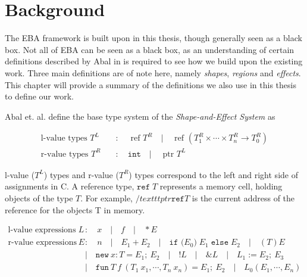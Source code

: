 \section{Background}
The EBA framework is built upon in this thesis, though generally seen as a black box. Not all of EBA can be seen as a black box, as an understanding of certain definitions described by Abal in \cite{Abal2017EffectiveBF} is required to see how we build upon the existing work. Three main definitions are of note here, namely \textit{shapes}, \textit{regions} and \textit{effects}. This chapter will provide a summary of the definitions we also use in this thesis to define our work. 

\newpar Abal et. al. define the base type system of the \textit{Shape-and-Effect System} as 

\begin{equation*}
\begin{aligned}
    \text {l-value types } T^{L} \quad &: \quad \text{ ref } T^{R} \quad | \quad \text{ ref } \left(T_{1}^{R} \times \cdots \times T_{n}^{R} \rightarrow T_{0}^{R}\right)\\
    \text {r-value types } T^{R} \quad &: \quad \texttt {int} \quad | \quad \text{ ptr } T^{L}
\end{aligned}
\end{equation*}

\noindent l-value ($T^{L}$) types and r-value ($T^{R}$) types correspond to the left and right side of assignments in C. A reference type, $\texttt{ref} \; T$ represents a memory cell, holding objects of the type $T$. For example, $/texttt{ptr} \texttt{ref} T$ is the current address of the reference for the objects T in memory. 

\begin{equation*}
\begin{aligned}
    \text {l-value expressions } L \quad &: \quad x \quad | \quad f \quad | \quad *E \\
    \text{r-value expressions } E \quad &: \quad n \quad | \quad E_{1}+E_{2} \quad | \quad \texttt{if (}E_0\texttt{)} \; E_1 \; \texttt{else} \; E_2 \quad | \quad (T) E \\
    &| \quad \texttt{new} \: x : T=E_1 ;\: E_2 \quad | \quad !L \quad | \quad \& L \quad | \quad L_1 := E_2 ;\: E_3 \\
    &| \quad \texttt{fun} \:T\:f\:(T_1\:x_1, \cdots, T_n\:x_n) = E_1 ;\: E_2 \quad | \quad L_0(E_1, \cdots, E_n)
\end{aligned}
\end{equation*}

